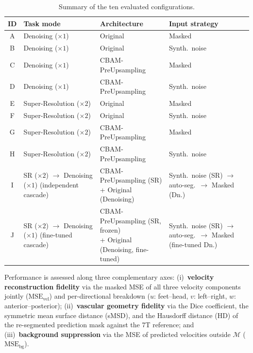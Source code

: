 \documentclass[11pt]{article}
\begin{document}
\begin{table}[!htbp]
  \centering
  \caption{Summary of the ten evaluated configurations.}
  \label{tab:experiment_map}
  \small
  \begin{tabular}{clll}
    \toprule
    ID & Task mode & Architecture & Input strategy \\
    \midrule
    A & Denoising ($\times 1$) & Original           & Masked \\
    B & Denoising ($\times 1$) & Original           & Synth.\ noise \\
    C & Denoising ($\times 1$) & CBAM-PreUpsampling & Masked \\
    D & Denoising ($\times 1$) & CBAM-PreUpsampling & Synth.\ noise \\
    \midrule
    E & Super-Resolution ($\times 2$) & Original           & Masked \\
    F & Super-Resolution ($\times 2$) & Original           & Synth.\ noise \\
    G & Super-Resolution ($\times 2$) & CBAM-PreUpsampling & Masked \\
    H & Super-Resolution ($\times 2$) & CBAM-PreUpsampling & Synth.\ noise \\
    \midrule
    I & \makecell[l]{SR ($\times 2$) $\to$ Denoising ($\times 1$)\\(independent cascade)} &
      \makecell[l]{CBAM-PreUpsampling (SR)\\+ Original (Denoising)} &
      \makecell[l]{Synth.\ noise (SR) $\to$\\auto-seg.\ $\to$ Masked (Dn.)} \\
    J & \makecell[l]{SR ($\times 2$) $\to$ Denoising ($\times 1$)\\(fine-tuned cascade)} &
      \makecell[l]{CBAM-PreUpsampling (SR, frozen)\\+ Original (Denoising, fine-tuned)} &
      \makecell[l]{Synth.\ noise (SR) $\to$\\auto-seg.\ $\to$ Masked (fine-tuned Dn.)} \\
    \bottomrule
  \end{tabular}
\end{table}

Performance is assessed along three complementary axes: (i)~\textbf{velocity reconstruction
fidelity} via the masked MSE of all three velocity components jointly ($\text{MSE}_\text{vel}$)
and per-directional breakdown ($u$: feet--head, $v$: left--right, $w$: anterior--posterior);
(ii)~\textbf{vascular geometry fidelity} via the Dice coefficient, the symmetric mean surface
distance (sMSD), and the Hausdorff distance (HD) of the re-segmented prediction mask against the
7T reference; and (iii)~\textbf{background suppression} via the MSE of predicted velocities
outside $\mathcal{M}$ ($\text{MSE}_\text{bg}$).
\end{document}
